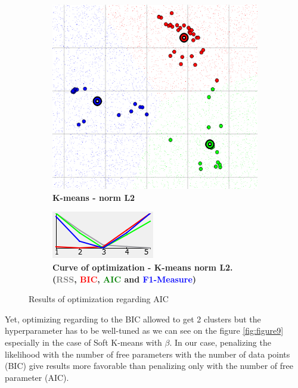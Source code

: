 \begin{figure} [ht]
\begin{subfigure}[t]{0.50\textwidth}
	\end{subfigure}\\
    \begin{subfigure}[t]{0.25\textwidth}
    \centering
    \includegraphics[height=0.08\textheight]{./clustering/opt_AIC_k_mean_L2_range5.png}
	\caption{\bf K-means - norm L2}
    \end{subfigure} 
	\hspace{20mm}
    \begin{subfigure}[t]{0.50\textwidth}
    \centering
    \includegraphics[height=0.08\textheight]{./clustering/curve_opt_AIC_k_mean_L2_range5.png}
	\caption{\bf Curve of optimization - K-means norm L2. (\textcolor{gray}{RSS}, \textcolor{red}{BIC}, \textcolor{green}{AIC} and \textcolor{blue}{F1-Measure})}
    \end{subfigure}
\caption{Results of optimization regarding AIC}
\label{fig:figure8}
\end{figure}

Yet, optimizing regarding to the BIC allowed to get 2 clusters but the hyperparameter has to be well-tuned as we can see on the figure \ref{fig:figure9} especially in the case of Soft K-means with $\beta$. In our case, penalizing the likelihood with the number of free parameters with the number of data points (BIC) give results more favorable than penalizing only with the number of free parameter (AIC). 

